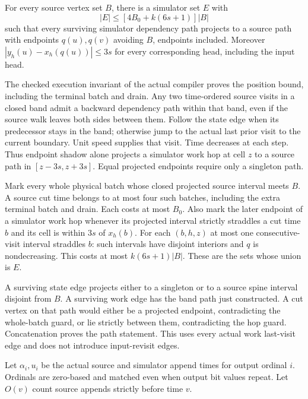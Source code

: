 \begin{lemma}\label{lem:guarded-projection}
For every source vertex set $B$, there is a simulator set $E$ with
\[
 |E|\le [4B_0+k(6s+1)]|B|
\]
such that every surviving simulator dependency path projects to a source
path with endpoints $q(u),q(v)$ avoiding $B$, endpoints included.
Moreover $|y_h(u)-x_h(q(u))|\le3s$ for every corresponding head, including
the input head.
\end{lemma}
\begin{outline}
The checked execution invariant of the actual compiler proves the position
bound, including the terminal batch and drain. Any two time-ordered source
visits in a closed band admit a backward dependency path within that band,
even if the source walk leaves both sides between them. Follow the state
edge when its predecessor stays in the band; otherwise jump to the actual
last prior visit to the current boundary. Unit speed supplies that visit.
Time decreases at each step. Thus endpoint shadow alone projects a simulator
work hop at cell $z$ to a source path in $[z-3s,z+3s]$. Equal projected
endpoints require only a singleton path.

Mark every whole physical batch whose closed projected source interval meets
$B$. A source cut time belongs to at most four such batches, including the
extra terminal batch and drain. Each costs at most $B_0$. Also mark the later
endpoint of a simulator work hop whenever its projected interval strictly
straddles a cut time $b$ and its cell is within $3s$ of $x_h(b)$. For each
$(b,h,z)$ at most one consecutive-visit interval straddles $b$: such intervals
have disjoint interiors and $q$ is nondecreasing. This costs at most
$k(6s+1)|B|$. These are the sets whose union is $E$.

A surviving state edge projects either to a singleton or to a source spine
interval disjoint from $B$. A surviving work edge has the band path just
constructed. A cut vertex on that path would either be a projected endpoint,
contradicting the whole-batch guard, or lie strictly between them, contradicting
the hop guard. Concatenation proves the path statement. This uses every actual
work last-visit edge and does not introduce input-revisit edges.
\end{outline}

Let $\alpha_i,u_i$ be the actual source and simulator append times for output
ordinal $i$. Ordinals are zero-based and matched even when output bit values
repeat. Let $O(v)$ count source appends strictly before time $v$.

